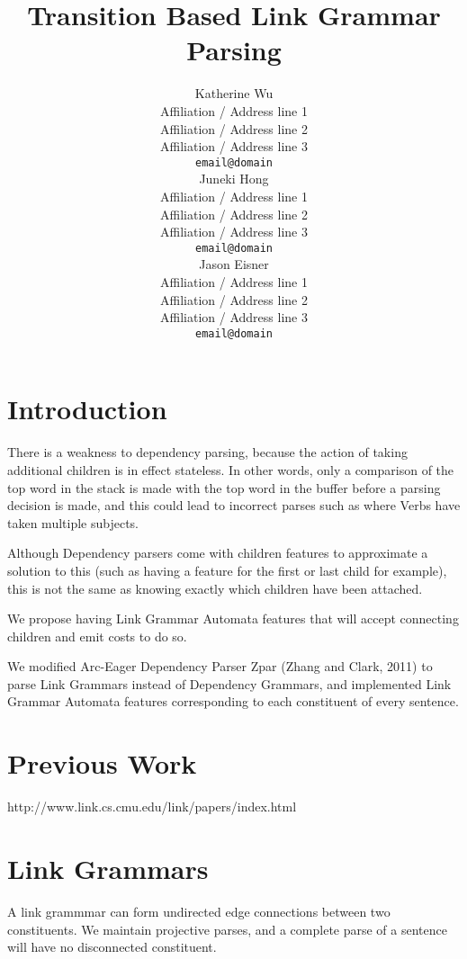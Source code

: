 \documentclass[11pt]{article}
\title{Transition Based Link Grammar Parsing}
\author{Katherine Wu \\
  Affiliation / Address line 1 \\
  Affiliation / Address line 2 \\
  Affiliation / Address line 3 \\
  {\tt email@domain} \\\And
  Juneki Hong \\
  Affiliation / Address line 1 \\
  Affiliation / Address line 2 \\
  Affiliation / Address line 3 \\
  {\tt email@domain} \\\And
  Jason Eisner \\
  Affiliation / Address line 1 \\
  Affiliation / Address line 2 \\
  Affiliation / Address line 3 \\
  {\tt email@domain} \\
  }
\date{}
\begin{document}
\maketitle
\begin{abstract}


\end{abstract}





\section{Introduction}

There is a weakness to dependency parsing, because the action of taking additional children is in effect stateless. In other words, only a comparison of the top word in the stack is made with the top word in the buffer before a parsing decision is made, and this could lead to incorrect parses such as where Verbs have taken multiple subjects. 

Although Dependency parsers come with children features to approximate a solution to this (such as having a feature for the first or last child for example), this is not the same as knowing exactly which children have been attached. 


We propose having Link Grammar Automata features that will accept connecting children and emit costs to do so.

We modified Arc-Eager Dependency Parser Zpar (Zhang and Clark, 2011) to parse Link Grammars instead of Dependency Grammars, and implemented Link Grammar Automata features corresponding to each constituent of every sentence.





\section{Previous Work}

http://www.link.cs.cmu.edu/link/papers/index.html


\section{Link Grammars}
A link grammmar can form undirected edge connections between two constituents. 
We maintain projective parses, and a complete parse of a sentence will have no disconnected constituent.
\end{document}

